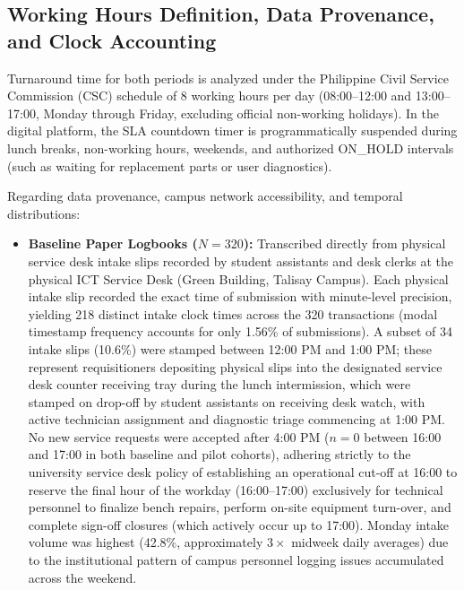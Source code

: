 \documentclass[conference]{IEEEtran}
\begin{document}
\subsection{Working Hours Definition, Data Provenance, and Clock Accounting}
Turnaround time for both periods is analyzed under the Philippine Civil Service Commission (CSC) schedule of 8 working hours per day (08:00--12:00 and 13:00--17:00, Monday through Friday, excluding official non-working holidays). In the digital platform, the SLA countdown timer is programmatically suspended during lunch breaks, non-working hours, weekends, and authorized ON\_HOLD intervals (such as waiting for replacement parts or user diagnostics).

Regarding data provenance, campus network accessibility, and temporal distributions:
\begin{itemize}
    \item \textbf{Baseline Paper Logbooks ($N = 320$):} Transcribed directly from physical service desk intake slips recorded by student assistants and desk clerks at the physical ICT Service Desk (Green Building, Talisay Campus). Each physical intake slip recorded the exact time of submission with minute-level precision, yielding 218 distinct intake clock times across the 320 transactions (modal timestamp frequency accounts for only 1.56\% of submissions). A subset of 34 intake slips (10.6\%) were stamped between 12:00 PM and 1:00 PM; these represent requisitioners depositing physical slips into the designated service desk counter receiving tray during the lunch intermission, which were stamped on drop-off by student assistants on receiving desk watch, with active technician assignment and diagnostic triage commencing at 1:00 PM. No new service requests were accepted after 4:00 PM ($n=0$ between 16:00 and 17:00 in both baseline and pilot cohorts), adhering strictly to the university service desk policy of establishing an operational cut-off at 16:00 to reserve the final hour of the workday (16:00--17:00) exclusively for technical personnel to finalize bench repairs, perform on-site equipment turn-over, and complete sign-off closures (which actively occur up to 17:00). Monday intake volume was highest (42.8\%, approximately $3\times$ midweek daily averages) due to the institutional pattern of campus personnel logging issues accumulated across the weekend.

\end{itemize}
\end{document}

